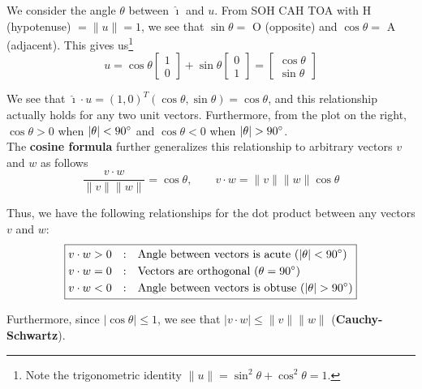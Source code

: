 \documentclass[11pt]{article}
\theoremstyle{plain}
\theoremstyle{definition}
\theoremstyle{remark}
\numberwithin{equation}{section}
\begin{document}
We consider the angle $\theta$ between $\hat{\imath}$ and $u$. From SOH CAH TOA with H (hypotenuse) $= \|u\| = 1$, we see that $\sin \theta =$ O (opposite) and $\cos \theta =$ A (adjacent). This gives us\footnote{Note the trigonometric identity $\| u \| = \sin^2 \theta + \cos^2 \theta = 1$.}
\begin{equation*}
u = \cos \theta  \begin{bmatrix} 1 \\ 0 \end{bmatrix} + \sin \theta \begin{bmatrix} 0 \\ 1 \end{bmatrix} =  \begin{bmatrix} \cos \theta \\ \sin \theta \end{bmatrix}
\end{equation*}

We see that $\hat{\imath} \cdot u = (1, 0)^T (\cos \theta, \sin \theta) = \cos \theta$, and this relationship actually holds for any two unit vectors. Furthermore, from the plot on the right, $\cos \theta > 0$ when $| \theta | < 90\degree$ and $\cos \theta < 0$ when $| \theta | > 90\degree$.
\\

The {\bf cosine formula} further generalizes this relationship to arbitrary vectors $v$ and $w$ as follows
\begin{equation*}
\frac {v \cdot w }{\|v\| \|w\|} = \cos \theta, \qquad v \cdot w = \| v \| \| w \| \cos \theta
\end{equation*}

Thus, we have the following relationships for the dot product between any vectors $v$ and $w$:
\[
\boxed{
\begin{aligned}
& v \cdot w > 0 & : \quad&\text{Angle between vectors is acute } (| \theta | < 90 \degree) \\
& v \cdot w = 0 & : \quad&\text{Vectors are orthogonal } (\theta = 90 \degree) \\
& v \cdot w < 0 & : \quad&\text{Angle between vectors is obtuse } (| \theta | > 90 \degree)
\end{aligned}
}
\]

Furthermore, since $| \cos \theta | \leq 1$, we see that $| v \cdot w | \leq \| v \| \| w \|$ ({\bf Cauchy-Schwartz}).
\\
\end{document}
